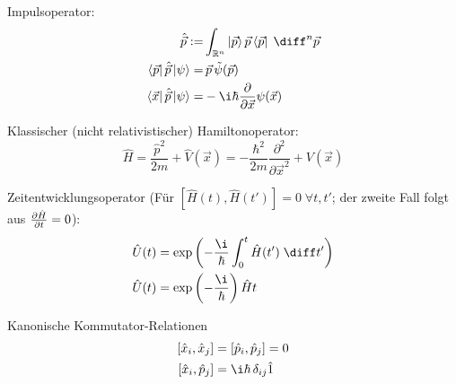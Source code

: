 \documentclass[11pt]{article}
\DeclareMathOperator*{\SumInt}{%
\mathchoice%
  {\ooalign{$\displaystyle\sum$\cr\hidewidth$\displaystyle\int$\hidewidth\cr}}
  {\ooalign{\raisebox{.14\height}{\scalebox{.7}{$\textstyle\sum$}}\cr\hidewidth$\textstyle\int$\hidewidth\cr}}
  {\ooalign{\raisebox{.2\height}{\scalebox{.6}{$\scriptstyle\sum$}}\cr$\scriptstyle\int$\cr}}
  {\ooalign{\raisebox{.2\height}{\scalebox{.6}{$\scriptstyle\sum$}}\cr$\scriptstyle\int$\cr}}
}
\numberwithin{equation}{section}
\begin{document}
      Impulsoperator:
      \begin{equation}
        \begin{aligned}
          \hat{\vec{p}} :=& \int_{\mathbb{R}^n} \Ket{\vec{p}} \vec{p} \Bra{\vec{p}}\;\diff^n\vec{p} \\
          \Bra{\vec{p}}\hat{\vec{p}}\Ket{\psi} =& \,\vec{p}\, \tilde{\psi}(\vec{p}) \\
          \Bra{\vec{x}}\hat{\vec{p}}\Ket{\psi} =& -\i\hbar\pder{}{\vec{x}} \psi(\vec{x}) \\
        \end{aligned}
      \end{equation}

      Klassischer (nicht relativistischer) Hamiltonoperator:
      \begin{equation}
        \hat{H} = \frac{\hat{p}^2}{2m}+\hat{V}(\vec{x}) = -\frac{\hbar^2}{2m}\frac{\partial^2}{\partial \vec{x}^2} + V(\vec{x})
      \end{equation}

      Zeitentwicklungsoperator (Für $\left[\hat{H}(t),\hat{H}(t')\right] = 0\;\forall t,t'$; der zweite Fall folgt aus $\frac{\partial \hat{H}}{\partial t}=0$):
      \begin{equation}
        \begin{aligned}
          \hat{U}(t) &= \exp{\left(-\frac{\i}{\hbar}\int_0^t \hat{H}(t')\;\diff t'\right)} \\
          \hat{U}(t) &= \exp{\left(-\frac{\i}{\hbar}\right)\hat{H} t} \\
        \end{aligned}
      \end{equation}

      Kanonische Kommutator-Relationen
      \begin{equation}
        \begin{aligned}
          \left[ \hat{x}_i, \hat{x}_j \right] &= \left[ \hat{p}_i, \hat{p}_j \right] = 0 \\
          \left[ \hat{x}_i, \hat{p}_j \right] &= \i\hbar\, \delta_{ij}\hat{1} \\
        \end{aligned}
      \end{equation}
\end{document}
